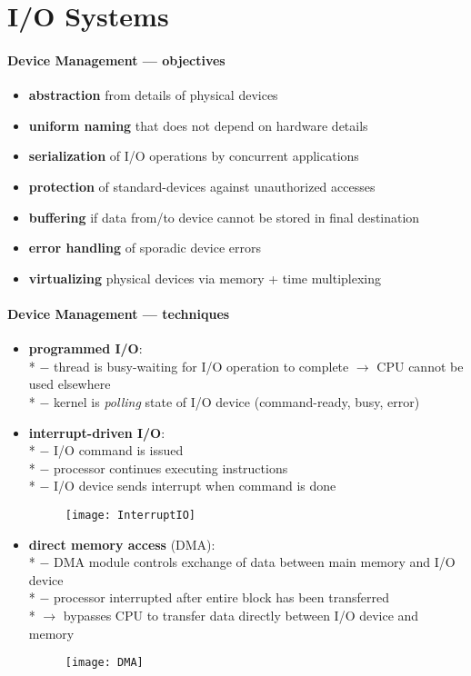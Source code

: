 \section{I/O Systems}

\paragraph{Device Management --- objectives}
\begin{itemize}
  \item \textbf{abstraction} from details of physical devices
  \item \textbf{uniform naming} that does not depend on hardware details
  \item \textbf{serialization} of I/O operations by concurrent applications
  \item \textbf{protection} of standard-devices against unauthorized accesses
  \item \textbf{buffering} if data from/to device cannot be stored in final destination
  \item \textbf{error handling} of sporadic device errors
  \item \textbf{virtualizing} physical devices via memory + time multiplexing
\end{itemize}

\paragraph{Device Management --- techniques}
\begin{itemize}
  \item \textbf{programmed I/O}: \\*
    $ - $ thread is busy-waiting for I/O operation to complete $ \to $ CPU cannot be used elsewhere \\*
    $ - $ kernel is \emph{polling} state of I/O device (command-ready, busy, error)
  \item \textbf{interrupt-driven I/O}: \\*
    $ - $ I/O command is issued \\*
    $ - $ processor continues executing instructions \\*
    $ - $ I/O device sends interrupt when command is done
  \begin{figure}[h]\centering\label{InterruptIO}\texttt{[image: InterruptIO]}\end{figure}
  \item \textbf{direct memory access} (DMA): \\*
    $ - $ DMA module controls exchange of data between main memory and I/O device \\*
    $ - $ processor interrupted after entire block has been transferred \\*
    $ \to $ bypasses CPU to transfer data directly between I/O device and memory
  \begin{figure}[h]\centering\label{DMA}\texttt{[image: DMA]}\end{figure}
\end{itemize}

